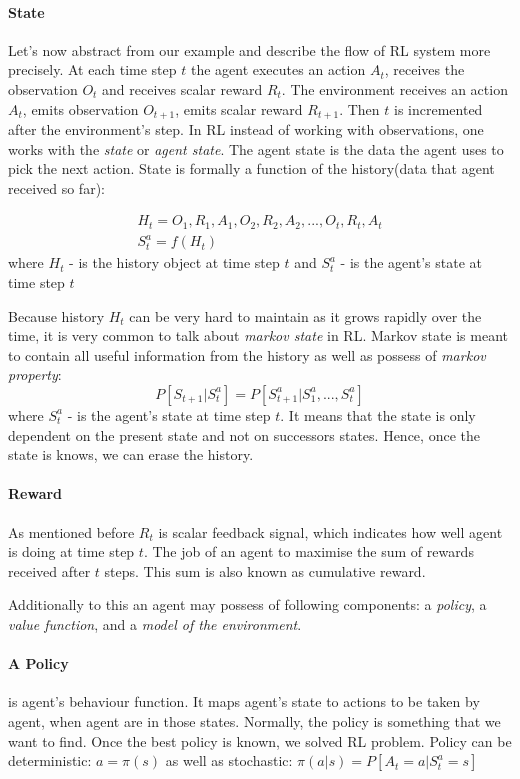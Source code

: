 \paragraph{State} \label{sec:comp_rl}
Let's now abstract from our example and describe the flow of RL system more precisely.
At each time step $t$ the agent executes an action $A_t$, receives the observation $O_t$
and receives scalar reward $R_t$. The environment receives an action $A_t$,
emits observation $O_{t+1}$, emits scalar reward $R_{t+1}$. Then $t$ is incremented
after the environment's step. In RL instead of working with observations, one works
with the \emph{state} or \emph{agent state}. The agent state is the data the agent uses
to pick the next action. State is formally a function of the
history(data that agent received so far):

\begin{align} \label{eq:rl_state}
	H_t = O_1, R_1, A_1, O_2, R_2, A_2, ..., O_t, R_t, A_t \\
	S_t^a = f(H_t)
\end{align}
where $H_t$ - is the history object at time step $t$ and
$S_t^a$ - is the agent's state at time step $t$

Because history $H_t$ can be very hard to maintain as it grows rapidly over the time,
it is very common to talk about \emph{markov state} in RL. Markov state is meant
to contain all useful information from the history as well as possess of \emph{markov property}:
\begin{equation} \label{eq:markov_property}
	P[S_{t+1} | S_t^a] = P[S_{t+1}^a | S_1^a, ..., S_t^a]
\end{equation}
where $S_t^a$ - is the agent's state at time step $t$.
It means that the state is only dependent on the present state and not on
successors states. Hence, once the state is knows, we can erase the history.

\paragraph{Reward} As mentioned before $R_t$ is scalar feedback signal, which
indicates how well agent is doing at time step $t$. The job of an agent to
maximise the sum of rewards received after $t$ steps. This sum is also known as
cumulative reward.

Additionally to this an agent may possess of following components:
a \emph{policy},
a \emph{value function}, and
a \emph{model of the environment}.

\paragraph{A Policy} is agent's behaviour function. It maps agent's state
to actions to be taken by agent, when agent are in those states. Normally, the policy is
something that we want to find. Once the best policy is known, we solved RL problem.
Policy can be deterministic: $a = \pi (s)$
as well as stochastic: $\pi(a|s) = P[A_t = a|S_t^a = s]$

